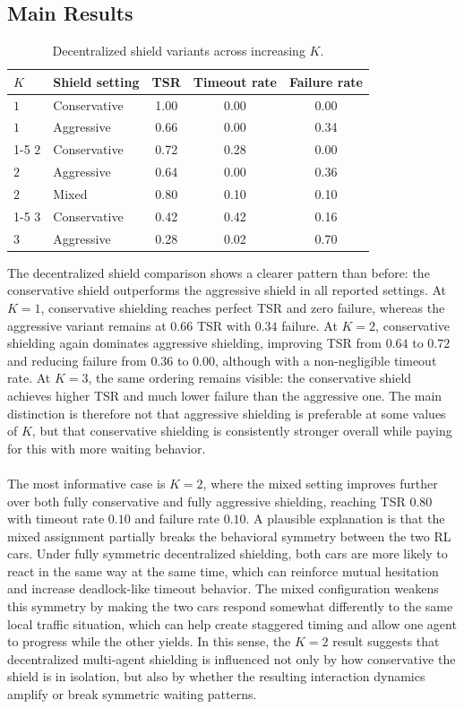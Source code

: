 \subsection{Main Results}
\begin{table}[H]
\centering
\caption{Decentralized shield variants across increasing \(K\).}
\label{tab:results-rq2-main}
\begin{tabular}{llccc}
\toprule
\textbf{\(K\)} & \textbf{Shield setting} & \textbf{TSR} & \textbf{Timeout rate} & \textbf{Failure rate} \\
\midrule
\(1\) & Conservative & 1.00 & 0.00 & 0.00 \\
\(1\) & Aggressive & 0.66 & 0.00 & 0.34 \\
\cmidrule(lr){1-5}
\(2\) & Conservative & 0.72 & 0.28 & 0.00 \\
\(2\) & Aggressive & 0.64 & 0.00 & 0.36 \\
\(2\) & Mixed & 0.80 & 0.10 & 0.10 \\
\cmidrule(lr){1-5}
\(3\) & Conservative & 0.42 & 0.42 & 0.16 \\
\(3\) & Aggressive & 0.28 & 0.02 & 0.70 \\
\bottomrule
\end{tabular}
\end{table}

The decentralized shield comparison shows a clearer pattern than before: the conservative shield outperforms the aggressive shield in all reported settings. At \(K=1\), conservative shielding reaches perfect TSR and zero failure, whereas the aggressive variant remains at \(0.66\) TSR with \(0.34\) failure. At \(K=2\), conservative shielding again dominates aggressive shielding, improving TSR from \(0.64\) to \(0.72\) and reducing failure from \(0.36\) to \(0.00\), although with a non-negligible timeout rate. At \(K=3\), the same ordering remains visible: the conservative shield achieves higher TSR and much lower failure than the aggressive one. The main distinction is therefore not that aggressive shielding is preferable at some values of \(K\), but that conservative shielding is consistently stronger overall while paying for this with more waiting behavior.
\\
\\
The most informative case is \(K=2\), where the mixed setting improves further over both fully conservative and fully aggressive shielding, reaching TSR \(0.80\) with timeout rate \(0.10\) and failure rate \(0.10\). A plausible explanation is that the mixed assignment partially breaks the behavioral symmetry between the two RL cars. Under fully symmetric decentralized shielding, both cars are more likely to react in the same way at the same time, which can reinforce mutual hesitation and increase deadlock-like timeout behavior. The mixed configuration weakens this symmetry by making the two cars respond somewhat differently to the same local traffic situation, which can help create staggered timing and allow one agent to progress while the other yields. In this sense, the \(K=2\) result suggests that decentralized multi-agent shielding is influenced not only by how conservative the shield is in isolation, but also by whether the resulting interaction dynamics amplify or break symmetric waiting patterns.

